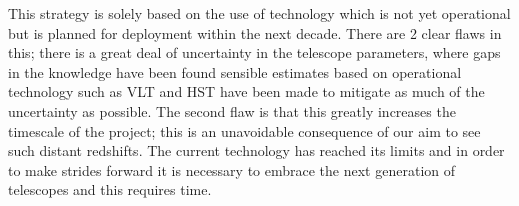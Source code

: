 		This strategy is solely based on the use of technology which is not yet operational but is planned for deployment within the next decade. There are 2 clear flaws in this; there is a great deal of uncertainty in the telescope parameters, where gaps in the knowledge have been found sensible estimates based on operational technology such as VLT and HST have been made to mitigate as much of the uncertainty as possible. The second flaw is that this greatly increases the timescale of the project; this is an unavoidable consequence of our aim to see such distant redshifts. The current technology has reached its limits and in order to make strides forward it is necessary to embrace the next generation of telescopes and this requires time.

